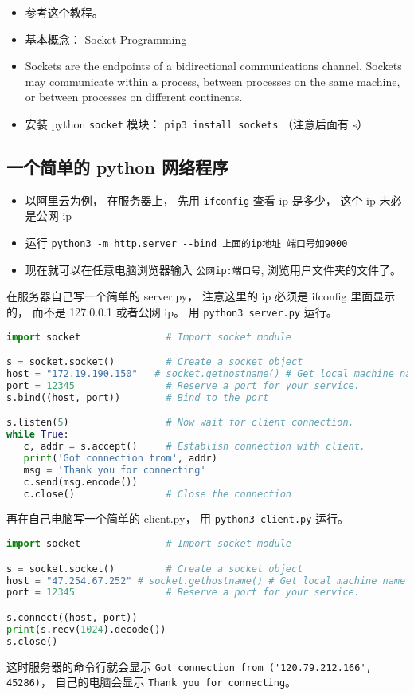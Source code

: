 
\begin{itemize}
\item 参考\href{https://www.tutorialspoint.com/python/python_networking.htm}{这个教程}。
\item 基本概念： Socket Programming
\item Sockets are the endpoints of a bidirectional communications channel. Sockets may communicate within a process, between processes on the same machine, or between processes on different continents.
\item 安装 python \verb|socket| 模块： \verb|pip3 install sockets| （注意后面有 s）
\end{itemize}

\subsection{一个简单的 python 网络程序}
\begin{itemize}
\item 以阿里云为例， 在服务器上， 先用 \verb|ifconfig| 查看 ip 是多少， 这个 ip 未必是公网 ip
\item 运行 \verb|python3 -m http.server --bind 上面的ip地址 端口号如9000|
\item 现在就可以在任意电脑浏览器输入 \verb|公网ip:端口号|, 浏览用户文件夹的文件了。
\end{itemize}

在服务器自己写一个简单的 server.py， 注意这里的 ip 必须是 ifconfig 里面显示的， 而不是 127.0.0.1 或者公网 ip。 用 \verb|python3 server.py| 运行。
\begin{lstlisting}[language=python, caption=server.py]
import socket               # Import socket module

s = socket.socket()         # Create a socket object
host = "172.19.190.150"   # socket.gethostname() # Get local machine name
port = 12345                # Reserve a port for your service.
s.bind((host, port))        # Bind to the port

s.listen(5)                 # Now wait for client connection.
while True:
   c, addr = s.accept()     # Establish connection with client.
   print('Got connection from', addr)
   msg = 'Thank you for connecting'
   c.send(msg.encode())
   c.close()                # Close the connection
\end{lstlisting}

再在自己电脑写一个简单的 client.py， 用 \verb|python3 client.py| 运行。
\begin{lstlisting}[language=python, caption=client.py]
import socket               # Import socket module

s = socket.socket()         # Create a socket object
host = "47.254.67.252" # socket.gethostname() # Get local machine name
port = 12345                # Reserve a port for your service.

s.connect((host, port))
print(s.recv(1024).decode())
s.close()
\end{lstlisting}

这时服务器的命令行就会显示 \verb|Got connection from ('120.79.212.166', 45286)|， 自己的电脑会显示 \verb|Thank you for connecting|。

